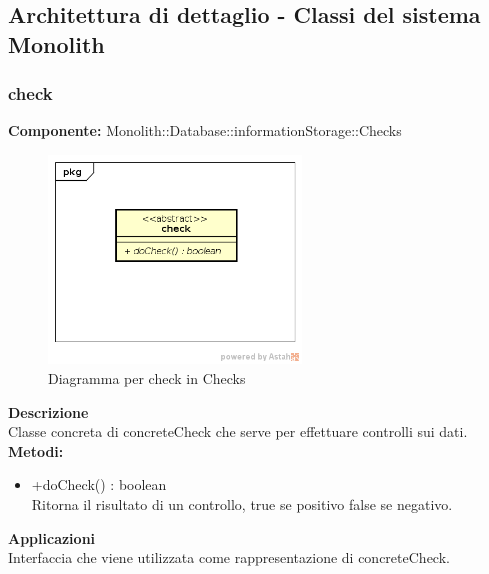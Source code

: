 \clearpage

\subsection{Architettura di dettaglio - Classi del sistema Monolith}\subsubsection{check}
\textbf{Componente:}  Monolith::Database::informationStorage::Checks\\
   \FloatBarrier
   \begin{figure}[ht]
   \centering
   \includegraphics[width=0.6\textwidth]{img/single-check}
   \caption{{Diagramma per check in Checks}}
\end{figure}
\FloatBarrier
\textbf{Descrizione}\\
Classe concreta di concreteCheck che serve per effettuare controlli sui dati.
\textbf{Metodi:}
\begin{itemize}\item +doCheck() : boolean \\Ritorna il risultato di un controllo, true se positivo false se negativo.\end{itemize} 


\textbf{Applicazioni}\\
Interfaccia che viene utilizzata come rappresentazione di concreteCheck. 


\clearpage


